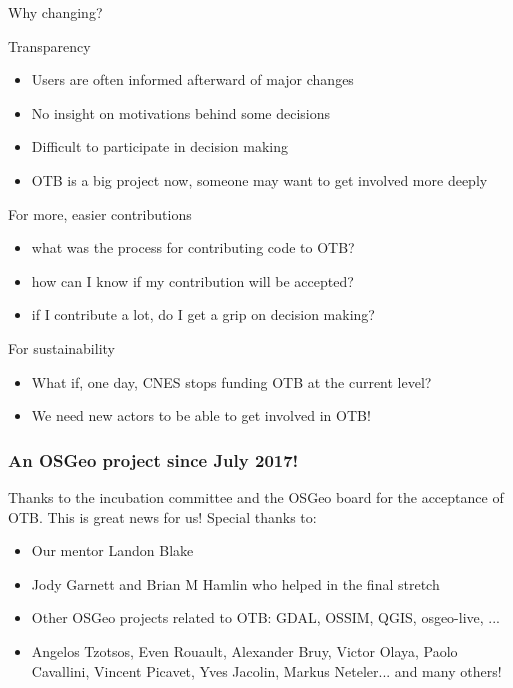\documentclass[smaller]{beamer}
\begin{document}
\begin{frame}[label={sec:orgheadline8}]{Why changing?}
\begin{block}{Transparency}
\begin{itemize}
\item Users are often informed afterward of major changes
\item No insight on motivations behind some decisions
\item Difficult to participate in decision making
\item OTB is a big project now, someone may want to get involved more deeply
\end{itemize}
\end{block}
\begin{block}{For more, easier contributions}
\begin{itemize}
\item what was the process for contributing code to OTB?
\item how can I know if my contribution will be accepted?
\item if I contribute a lot, do I get a grip on decision making?
\end{itemize}
\end{block}
\begin{block}{For sustainability}
\begin{itemize}
\item What if, one day, CNES stops funding OTB at the current level?
\item We need new actors to be able to get involved in OTB!
\end{itemize}
\end{block}
\end{frame}

\begin{frame}
\frametitle{An OSGeo project since July 2017!}
Thanks to the incubation committee and the OSGeo board for the
acceptance of OTB. This is great news for us! Special thanks to:
\begin{itemize}
\item Our mentor Landon Blake
\item Jody Garnett and Brian M Hamlin who helped in the final stretch
\item Other OSGeo projects related to OTB: GDAL, OSSIM, QGIS, osgeo-live, ...
\item Angelos Tzotsos, Even Rouault, Alexander Bruy, Victor Olaya, Paolo
    Cavallini, Vincent Picavet, Yves Jacolin, Markus Neteler... and many others!
\end{itemize}
\end{frame}
\end{document}
